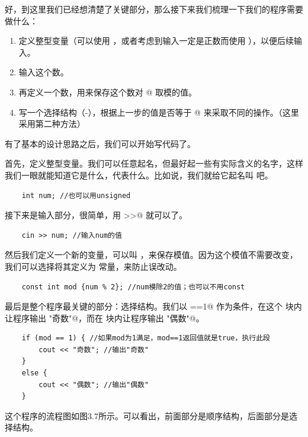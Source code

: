 好，到这里我们已经想清楚了关键部分，那么接下来我们梳理一下我们的程序需要做什么：
\begin{enumerate}
    \item 定义整型变量（可以使用 \lstinline@int@，或者考虑到输入一定是正数而使用 \lstinline@unsigned@），以便后续输入。
    \item 输入这个数。
    \item 再定义一个数，用来保存这个数对 @ 取模的值。
    \item 写一个选择结构（\lstinline@if@-\lstinline@else@），根据上一步的值是否等于 @ 来采取不同的操作。（这里采用第二种方法）
\end{enumerate}
有了基本的设计思路之后，我们可以开始写代码了。\par
首先，定义整型变量。我们可以任意起名，但最好起一些有实际含义的名字，这样我们一眼就能知道它是什么，代表什么。比如说，我们就给它起名叫 \lstinline@num@ 吧。
\begin{lstlisting}
    int num; //也可以用unsigned
\end{lstlisting}
接下来是输入部分，很简单，用 \lstinline@cin>>@ 就可以了。
\begin{lstlisting}
    cin >> num; //输入num的值
\end{lstlisting}
然后我们定义一个新的变量，可以叫 \lstinline@mod@，来保存模值。因为这个模值不需要改变，我们可以选择将其定义为 \lstinline@const@ 常量，来防止误改动。
\begin{lstlisting}
    const int mod {num % 2}; //num模除2的值；也可以不用const
\end{lstlisting}\par
最后是整个程序最关键的部分：选择结构。我们以 \lstinline@mod==1@ 作为条件，在这个 \lstinline@if@ 块内让程序输出 \lstinline@"奇数"@，而在 \lstinline@else@ 块内让程序输出 \lstinline@"偶数"@。
\begin{lstlisting}
    if (mod == 1) { //如果mod为1满足，mod==1返回值就是true，执行此段
        cout << "奇数"; //输出"奇数"
    }
    else {
        cout << "偶数"; //输出"偶数"
    }
    \end{lstlisting}
    这个程序的流程图如图3.7所示。可以看出，前面部分是顺序结构，后面部分是选择结构。\par
